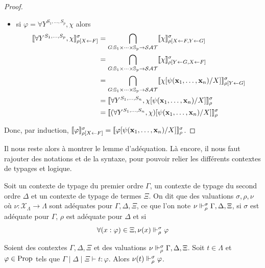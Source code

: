 \documentclass{article}
\begin{document}
\begin{proof}
\begin{itemize}
  \item si $\varphi = \forall Y^{S_1,\ldots,S_p},\chi$ alors
    \begin{align*}
      \llbracket \forall Y^{S_1,\ldots,S_p}, \chi \rrbracket_{\rho[X\leftarrow F]}^\sigma &= \bigcap_{G : \mathbb{S}_1\times\cdots\times\mathbb{S}_p \to \mathcal {SAT}}\llbracket \chi \rrbracket_{\rho[X\leftarrow F, Y\leftarrow G]}^\sigma\\
      &= \bigcap_{G : \mathbb{S}_1\times\cdots\times\mathbb{S}_p\to\mathcal {SAT}}\llbracket \chi \rrbracket_{\rho[Y\leftarrow G, X\leftarrow F]}^\sigma\\
      &= \bigcap_{G : \mathbb{S}_1\times\cdots\times\mathbb{S}_p\to\mathcal {SAT}}\llbracket \chi[\psi(\mathbf{x}_1,\ldots,\mathbf{x}_n)/X] \rrbracket_{\rho[Y\leftarrow G]}^\sigma\\
      &= \llbracket \forall Y^{S_1,\ldots,S_n}, \chi[\psi(\mathbf{x}_1,\ldots,\mathbf{x}_n)/X] \rrbracket_\rho^\sigma\\
      &= \llbracket (\forall Y^{S_1,\ldots,S_n}, \chi)[\psi(\mathbf{x}_1,\ldots,\mathbf{x}_n)/X] \rrbracket_\rho^\sigma
    \end{align*}
  \end{itemize}
  Donc, par induction, $\llbracket \varphi \rrbracket_{\rho[X\leftarrow F]}^\sigma = \llbracket \varphi[\psi(\mathbf{x}_1,\ldots,\mathbf{x}_n)/X] \rrbracket_\rho^\sigma$.
\end{proof}

Il nous reste alors à montrer le lemme d'adéquation. Là encore, il nous faut rajouter des notations et de la syntaxe, pour pouvoir relier les différents contextes de typages et logique.

\begin{defi}
  Soit un contexte de typage du premier ordre $\Gamma$, un contexte de typage du second ordre $\Delta$ et un contexte de typage de termes $\Xi$. On dit que des valuations $\sigma, \rho, \nu$ où $\nu : \mathcal X_\Lambda \to \Lambda$ sont adéquates pour $\Gamma,\Delta,\Xi$, ce que l'on note $\nu\Vdash_\rho^\sigma \Gamma,\Delta,\Xi$, si $\sigma$ est adéquate pour $\Gamma$, $\rho$ est adéquate pour $\Delta$ et si
  \[\forall (x : \varphi) \in \Xi, \nu(x)\Vdash_\rho^\sigma\varphi\]
\end{defi}

\begin{lem}[Adéquation]
  Soient des contextes $\Gamma,\Delta,\Xi$ et des valuations $\nu\Vdash_\rho^\sigma \Gamma,\Delta,\Xi$. Soit $t\in\Lambda$ et $\varphi\in\mathrm{Prop}$ tels que $\Gamma\mid\Delta\mid\Xi\vdash t : \varphi$. Alors $\nu(t) \Vdash_\rho^\sigma \varphi$.
\end{lem}
\end{document}
